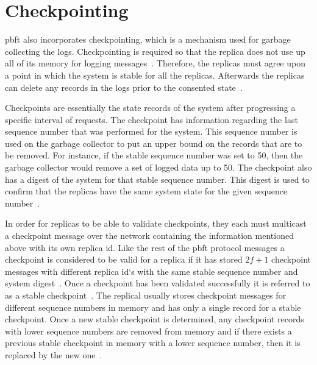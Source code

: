 \section{Checkpointing}
\label{sec:checkpoint}
\ac{pbft} also incorporates checkpointing, which is a mechanism used for garbage collecting the logs. Checkpointing is required so that the replica does not use up all of its memory for logging messages~\cite[p.~261]{BOOK:BuildDepDistSyst}. Therefore, the replicas must agree upon a point in which the system is stable for all the replicas. Afterwards the replicas can delete any records in the logs prior to the consented state~\cites[p.~5]{PAPER:OGPBFT}[p.~410]{PAPER:PBFTRecovery}.

Checkpoints are essentially the state records of the system after progressing a specific interval of requests. The checkpoint has information regarding the last sequence number that was performed for the system. This sequence number is used on the garbage collector to put an upper bound on the records that are to be removed. For instance, if the stable sequence number was set to 50, then the garbage collector would remove a set of logged data up to 50. The checkpoint also has a digest of the system for that stable sequence number. This digest is used to confirm that the replicas have the same system state for the given sequence number~\cites[p.~5]{PAPER:OGPBFT}[p.~410]{PAPER:PBFTRecovery}.

In order for replicas to be able to validate checkpoints, they each must multicast a checkpoint message over the network containing the information mentioned above with its own replica id. Like the rest of the \ac{pbft} protocol messages a checkpoint is considered to be valid for a replica if it has stored $2f+1$ checkpoint messages with different replica id`s with the same stable sequence number and system digest~\cites[p.~261-262]{BOOK:BuildDepDistSyst}[p.~5]{PAPER:OGPBFT}[p.~410]{PAPER:PBFTRecovery}. Once a checkpoint has been validated successfully it is referred to as a stable checkpoint~\cites[p.~3]{PAPER:DPBFT}[p.~261]{BOOK:BuildDepDistSyst}. The replical usually stores checkpoint messages for different sequence numbers in memory and has only a single record for a stable checkpoint. Once a new stable checkpoint is determined, any checkpoint records with lower sequence numbers are removed from memory and if there exists a previous stable checkpoint in memory with a lower sequence number, then it is replaced by  the new one~\cite[p.~261-262]{BOOK:BuildDepDistSyst}.


